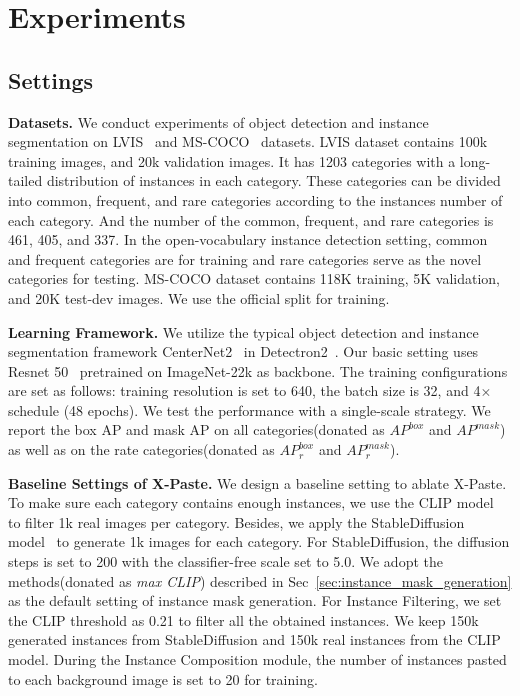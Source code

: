 \documentclass{article}
\begin{document}
\section{Experiments}
\label{sec:exp}

\subsection{Settings}
\noindent \textbf{Datasets.} We conduct experiments of object detection and instance segmentation on LVIS~\cite{LVIS} and MS-COCO~\cite{COCO} datasets. LVIS dataset contains 100k training images, and 20k validation images. It has 1203 categories with a long-tailed distribution of instances in each category. These categories can be  divided into common, frequent, and rare categories according to the instances number of each category. And the number of the common, frequent, and rare categories is 461, 405, and 337. In the open-vocabulary instance detection setting, common and frequent categories are for training and rare categories serve as the novel categories for testing. MS-COCO dataset contains 118K training, 5K validation, and 20K test-dev images. We use the official split for training. 

\noindent \textbf{Learning Framework.} We utilize the typical object detection and instance segmentation framework CenterNet2~\cite{CenterNet2} in Detectron2~\cite{wu2019detectron2}. Our basic setting uses Resnet 50~\cite{Resnet} pretrained on ImageNet-22k as backbone. The training configurations are set as follows: training resolution is set to 640, the batch size is 32, and 4$\times$ schedule (48 epochs). We test the performance with a single-scale strategy. We report the box AP and mask AP on all categories(donated as $AP^{box}$ and $AP^{mask}$) as well as on the rate categories(donated as $AP_r^{box}$ and $AP_r^{mask}$). 



\noindent \textbf{Baseline Settings of X-Paste.} We design a baseline setting to ablate X-Paste. To make sure each category contains enough instances, we use the CLIP model~\cite{CLIP} to filter 1k real images per category. Besides, we apply the StableDiffusion model~\cite{ldm} to generate 1k images for each category. For StableDiffusion, the diffusion steps is set to 200 with the classifier-free scale set to 5.0. We adopt the methods(donated as \emph{max CLIP}) described in Sec~\ref{sec:instance_mask_generation} as the default setting of instance mask generation. For Instance Filtering, we set the CLIP threshold as 0.21 to filter all the obtained instances. We keep 150k generated instances from StableDiffusion and 150k real instances from the CLIP model. During the Instance Composition module, the number of instances  pasted to each background image is set to 20 for training.
\end{document}
